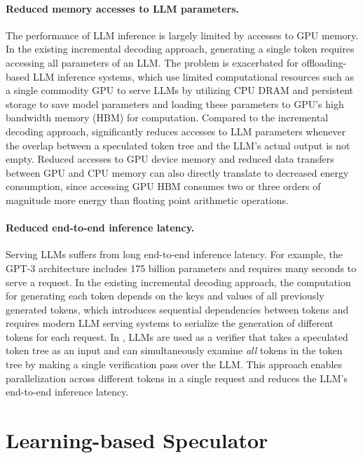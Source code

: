 \paragraph{Reduced memory accesses to LLM parameters.} The performance of LLM inference is largely limited by accesses to GPU memory.
In the existing incremental decoding approach, generating a single token requires accessing all parameters of an LLM.
The problem is exacerbated for offloading-based LLM inference systems, which use limited computational resources such as a single commodity GPU to serve LLMs by utilizing CPU DRAM and persistent storage to save model parameters and loading these parameters to GPU's high bandwidth memory (HBM) for computation.
Compared to the incremental decoding approach, \SpecInfer significantly reduces accesses to LLM parameters whenever the overlap between a speculated token tree and the LLM's actual output is not empty.
Reduced accesses to GPU device memory and reduced data transfers between GPU and CPU memory can also directly translate to decreased energy consumption, since accessing GPU HBM consumes two or three orders of magnitude more energy than floating point arithmetic operations.

\paragraph{Reduced end-to-end inference latency.}
Serving LLMs suffers from long end-to-end inference latency.
For example, the GPT-3 architecture includes 175 billion parameters and requires many seconds to serve a request.
In the existing incremental decoding approach, the computation for generating each token depends on the keys and values of all previously generated tokens, which introduces sequential dependencies between tokens and requires modern LLM serving systems to serialize the generation of different tokens for each request.
In \SpecInfer, LLMs are used as a verifier that takes a speculated token tree as an input and can simultaneously examine {\em all} tokens in the token tree by making a single verification pass over the LLM.
This approach enables parallelization across different tokens in a single request and reduces the LLM's end-to-end inference latency.

\section{Learning-based Speculator}
\label{specinfer:sec:speculation}

